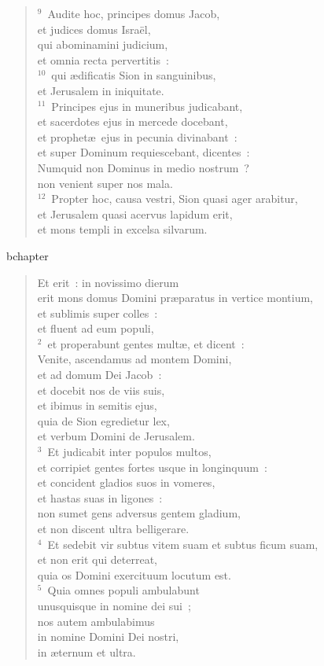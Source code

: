 \begin{verse}
${}^{9}$~Audite hoc, principes domus Jacob,\\ et judices domus Isra\"el,\\ qui abominamini judicium,\\ et omnia recta pervertitis~:\\
${}^{10}$~qui \ae dificatis Sion in sanguinibus,\\ et Jerusalem in iniquitate.\\
${}^{11}$~Principes ejus in muneribus judicabant,\\ et sacerdotes ejus in mercede docebant,\\ et prophet\ae\ ejus in pecunia divinabant~:\\ et super Dominum requiescebant, dicentes~:\\ Numquid non Dominus in medio nostrum~?\\ non venient super nos mala.\\
${}^{12}$~Propter hoc, causa vestri, Sion quasi ager arabitur,\\ et Jerusalem quasi acervus lapidum erit,\\ et mons templi in excelsa silvarum.\end{verse}


bchapter\begin{verse}\vspace{-19pt}Et erit~: in novissimo dierum\\ erit mons domus Domini pr\ae paratus in vertice montium,\\ et sublimis super colles~:\\ et fluent ad eum populi,\\
${}^{2}$~et properabunt gentes mult\ae , et dicent~:\\ Venite, ascendamus ad montem Domini,\\ et ad domum Dei Jacob~:\\ et docebit nos de viis suis,\\ et ibimus in semitis ejus,\\ quia de Sion egredietur lex,\\ et verbum Domini de Jerusalem.\\
${}^{3}$~Et judicabit inter populos multos,\\ et corripiet gentes fortes usque in longinquum~:\\ et concident gladios suos in vomeres,\\ et hastas suas in ligones~:\\ non sumet gens adversus gentem gladium,\\ et non discent ultra belligerare.\\
${}^{4}$~Et sedebit vir subtus vitem suam et subtus ficum suam,\\ et non erit qui deterreat,\\ quia os Domini exercituum locutum est.\\
${}^{5}$~Quia omnes populi ambulabunt\\ unusquisque in nomine dei sui~;\\ nos autem ambulabimus\\ in nomine Domini Dei nostri,\\ in \ae ternum et ultra.\end{verse}


